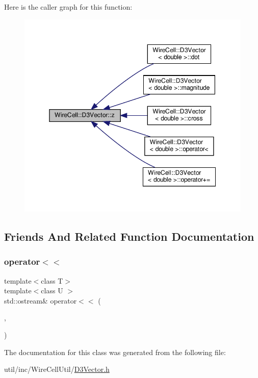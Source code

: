 Here is the caller graph for this function\+:
\nopagebreak
\begin{figure}[H]
\begin{center}
\leavevmode
\includegraphics[width=345pt]{class_wire_cell_1_1_d3_vector_a75a340da006d17ee06a8c097fa09c25f_icgraph}
\end{center}
\end{figure}


\subsection{Friends And Related Function Documentation}
\mbox{\label{class_wire_cell_1_1_d3_vector_af5d9b1d051306777ae5d07608467d1a0}} 
\subsubsection{\texorpdfstring{operator$<$$<$}{operator<<}}
{\footnotesize\ttfamily template$<$class T$>$ \\
template$<$class U $>$ \\
std\+::ostream\& operator$<$$<$ (\begin{DoxyParamCaption}\item[{std\+::ostream \&}]{,  }\item[{const \hyperlink{class_wire_cell_1_1_d3_vector}{D3\+Vector}$<$ U $>$ \&}]{ }\end{DoxyParamCaption})\hspace{0.3cm}{\ttfamily [friend]}}



The documentation for this class was generated from the following file\+:\begin{DoxyCompactItemize}
\item 
util/inc/\+Wire\+Cell\+Util/\hyperlink{_d3_vector_8h}{D3\+Vector.\+h}\end{DoxyCompactItemize}
